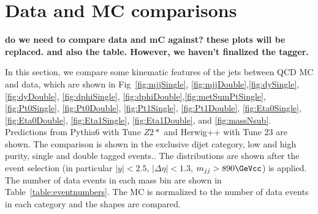 \newpage
\section{Data and MC comparisons}
\label{sec:data-mc-comp}


{\bf do we need to compare data and mC against? 
these plots will be replaced. and also the table. 
However, we haven't finalized the tagger. 
}




In this section, we compare some kinematic features of the jets between QCD MC and data, which are
 shown in Fig~\ref{fig:mjjSingle}, \ref{fig:mjjDouble},\ref{fig:dySingle}, \ref{fig:dyDouble}, \ref{fig:dphiSingle}, 
\ref{fig:dphiDouble},\ref{fig:metSumPtSingle},
\ref{fig:Pt0Single}, \ref{fig:Pt0Double}, \ref{fig:Pt1Single}, \ref{fig:Pt1Double},
\ref{fig:Eta0Single}, \ref{fig:Eta0Double}, \ref{fig:Eta1Single}, \ref{fig:Eta1Double},
and \ref{fig:massNsub}.
Predictions from Pythia6 with Tune $Z2*$ and Herwig++ with Tune 23 are shown.
The comparison is shown in the exclusive dijet category, low and high purity,  single and double tagged events..
The distributions are shown after the event selection (in particular $|y| < 2.5$, $|\Delta\eta|<1.3$, $m_{jj} > 890  \GeVcc$) is applied.
The number of data events in each mass bin are shown in Table~\ref{table:eventnumbers}.
The MC is normalized to the number of data events in each category and the shapes are compared.


